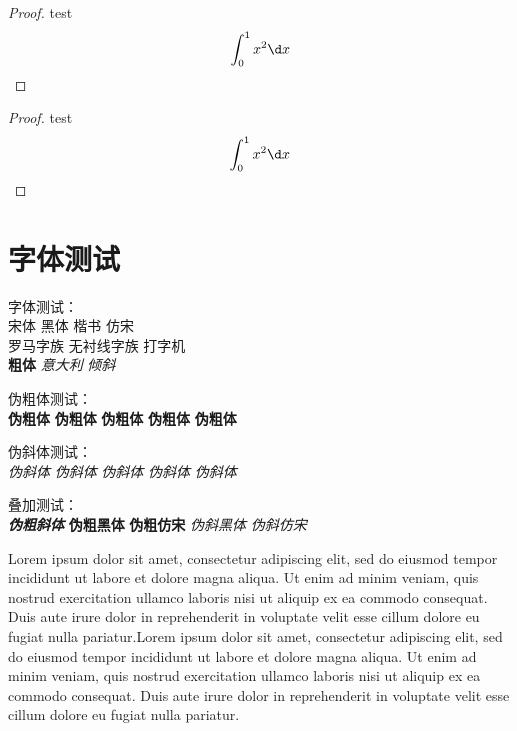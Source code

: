 \begin{proof}
  test
  \[
    \int_{0}^{1} x^2 \d x
  \]
\end{proof}

\begin{proof}
  test
  \[
    \int_{0}^{1} x^2 \d x \qedhere
  \]
\end{proof}


\section{字体测试}
字体测试：\\
{宋体} {\heiti 黑体} {\kaishu 楷书} {\fangsong 仿宋}\\
{\rmfamily 罗马字族} {\sffamily 无衬线字族} {\ttfamily 打字机}\\
{\bfseries 粗体} {\itshape 意大利} {\slshape 倾斜}

伪粗体测试：\\
{\bfseries\songti 伪粗体} {\bfseries\kaishu 伪粗体} {\bfseries\heiti 伪粗体} {\bfseries\fangsong 伪粗体} {\bfseries 伪粗体}

伪斜体测试：\\
{\itshape\songti 伪斜体} {\itshape\kaishu 伪斜体} {\itshape\heiti 伪斜体} {\itshape\fangsong 伪斜体} {\itshape 伪斜体}

叠加测试：\\
{\bfseries\itshape 伪粗斜体} {\bfseries\sffamily 伪粗黑体} {\bfseries\ttfamily 伪粗仿宋} {\itshape\sffamily 伪斜黑体} {\itshape\ttfamily 伪斜仿宋}

Lorem ipsum dolor sit amet, consectetur adipiscing elit, sed do eiusmod tempor incididunt ut labore et dolore magna aliqua. Ut enim ad minim veniam, quis nostrud exercitation ullamco laboris nisi ut aliquip ex ea commodo consequat. Duis aute irure dolor in reprehenderit in voluptate velit esse cillum dolore eu fugiat nulla pariatur.Lorem ipsum dolor sit amet, consectetur adipiscing elit, sed do eiusmod tempor incididunt ut labore et dolore magna aliqua. Ut enim ad minim veniam, quis nostrud exercitation ullamco laboris nisi ut aliquip ex ea commodo consequat. Duis aute irure dolor in reprehenderit in voluptate velit esse cillum dolore eu fugiat nulla pariatur.